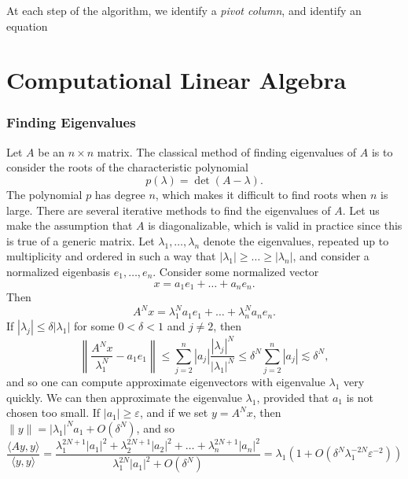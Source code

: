 At each step of the algorithm, we identify a \emph{pivot column}, and identify an equation





\part{Computational Linear Algebra}

\section{Finding Eigenvalues}

Let $A$ be an $n \times n$ matrix. The classical method of finding eigenvalues of $A$ is to consider the roots of the characteristic polynomial
%
\[ p(\lambda) = \det(A - \lambda). \]
%
The polynomial $p$ has degree $n$, which makes it difficult to find roots when $n$ is large. There are several iterative methods to find the eigenvalues of $A$. Let us make the assumption that $A$ is diagonalizable, which is valid in practice since this is true of a generic matrix. Let $\lambda_1, \dots, \lambda_n$ denote the eigenvalues, repeated up to multiplicity and ordered in such a way that $|\lambda_1| \geq \dots \geq |\lambda_n|$, and consider a normalized eigenbasis $e_1,\dots,e_n$. Consider some normalized vector
%
\[ x = a_1 e_1 + \dots + a_n e_n. \]
%
Then
%
\[ A^N x = \lambda_1^N a_1 e_1 + \dots + \lambda_n^N a_n e_n. \]
%
If $|\lambda_j| \leq \delta |\lambda_1|$ for some $0 < \delta < 1$ and $j \neq 2$, then
%
\[ \left\| \frac{A^N x}{\lambda_1^N} - a_1 e_1 \right\| \leq \sum_{j = 2}^n |a_j| \frac{|\lambda_j|^N}{|\lambda_1|^N} \leq \delta^N \sum_{j = 2}^n |a_j| \lesssim \delta^N, \]
%
and so one can compute approximate eigenvectors with eigenvalue $\lambda_1$ very quickly. We can then approximate the eigenvalue $\lambda_1$, provided that $a_1$ is not chosen too small. If $|a_1| \geq \varepsilon$, and if we set $y = A^N x$, then $\| y \| = |\lambda_1|^N a_1 + O(\delta^N)$, and so
%
\[ \frac{\langle Ay, y \rangle}{\langle y, y \rangle} = \frac{\lambda_1^{2N+1} |a_1|^2 + \lambda_2^{2N+1} |a_2|^2 + \dots + \lambda_n^{2N+1} |a_n|^2}{\lambda_1^{2N} |a_1|^2 + O(\delta^N)} = \lambda_1 \left( 1 + O( \delta^N \lambda_1^{-2N} \varepsilon^{-2} ) \right) \]




